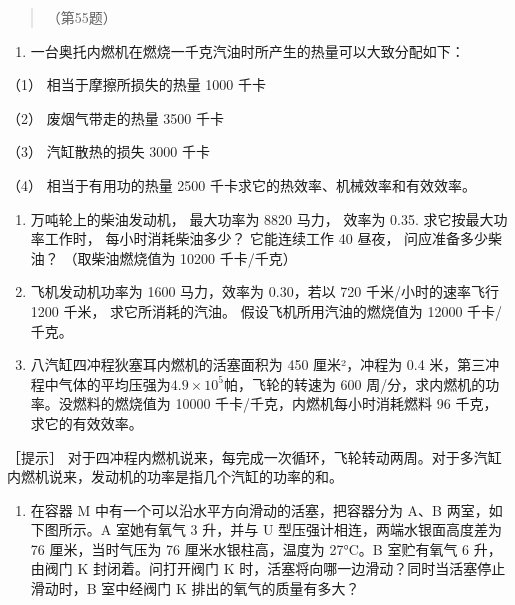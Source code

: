 \begin{quote}
（第55题）
\end{quote}

\begin{enumerate}
\def\labelenumi{\arabic{enumi}.}
\setcounter{enumi}{55}
\tightlist
\item
  一台奥托内燃机在燃烧一千克汽油时所产生的热量可以大致分配如下：
\end{enumerate}

（1） 相当于摩擦所损失的热量 1000 千卡

（2） 废烟气带走的热量 3500 千卡

（3） 汽缸散热的损失 3000 千卡

（4） 相当于有用功的热量 2500 千卡求它的热效率、机械效率和有效效率。

\begin{enumerate}
\def\labelenumi{\arabic{enumi}.}
\setcounter{enumi}{56}
\item
  万吨轮上的柴油发动机， 最大功率为 8820 马力， 效率为 0.35.
  求它按最大功率工作时， 每小时消耗柴油多少？ 它能连续工作 40 昼夜，
  问应准备多少柴油？ （取柴油燃烧值为 10200 千卡/千克）
\item
  飞机发动机功率为 1600 马力，效率为 0.30，若以 720 千米/小时的速率飞行
  1200 千米， 求它所消耗的汽油。 假设飞机所用汽油的燃烧值为 12000
  千卡/千克。
\item
  八汽缸四冲程狄塞耳内燃机的活塞面积为 450 厘米²，冲程为 0.4
  米，第三冲程中气体的平均压强为\(4.9 \times 10^{5}\)帕，飞轮的转速为
  600 周/分，求内燃机的功率。没燃料的燃烧值为 10000
  千卡/千克，内燃机每小时消耗燃料 96 千克，求它的有效效率。
\end{enumerate}

［提示］
对于四冲程内燃机说来，每完成一次循环，飞轮转动两周。对于多汽缸内燃机说来，发动机的功率是指几个汽缸的功率的和。

\begin{enumerate}
\def\labelenumi{\arabic{enumi}.}
\setcounter{enumi}{59}
\tightlist
\item
  在容器 M 中有一个可以沿水平方向滑动的活塞，把容器分为 A、B
  两室，如下图所示。A 室她有氧气 3 升，并与 U
  型压强计相连，两端水银面高度差为 76 厘米，当时气压为 76
  厘米水银柱高，温度为 27°C。B 室贮有氧气 6 升，由阀门 K
  封闭着。问打开阀门 K 时，活塞将向哪一边滑动？同时当活塞停止滑动时，B
  室中经阀门 K 排出的氧气的质量有多大？
\end{enumerate}

